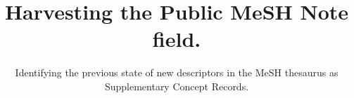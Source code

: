 %
%
%
%
%
\RequirePackage{fix-cm}
%
\documentclass[twocolumn]{svjour3}          %
%
\smartqed  %
%
\usepackage{graphicx}
\setlength {\marginparwidth }{2cm}
\usepackage[colorinlistoftodos]{todonotes}
\usepackage{multirow}
\usepackage{hyperref}
\usepackage{array}
\usepackage{tabu}
\usepackage{tabularx}
\newcolumntype{M}[1]{>{\centering\arraybackslash}m{#1}}
\newcolumntype{R}[1]{>{\raggedleft\arraybackslash}m{#1}}
\newcolumntype{L}[1]{>{\arraybackslash}m{#1}}

%
%
%
%
%

\sloppy

\title{Harvesting the Public MeSH Note field.
}
\subtitle{Identifying the previous state of new descriptors in the MeSH thesaurus as Supplementary Concept Records.
}

